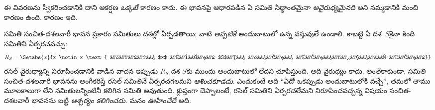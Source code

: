 \documentclass[../../../include/open-logic-section]{subfiles}
\begin{document}
ఈ వివరణను స్వీకరించడానికి దాని ఆకర్షణ
\emph{ఒక్కటే} కారణం కాదు.
ఈ భావనపై
ఆధారపడిన ఏ సమితి సిద్ధాంతమైనా
\emph{అవైరుధ్యమైనది} అని
నమ్మడానికి మంచి కారణం
ఉంది. కారణం ఇది.

సమితి సంచిత-దశలవారీ
భావన ప్రకారం సమితులు
దశల్లో ఏర్పడతాయి;
వాటి 
\emph{అప్పటికే} అందుబాటులో ఉన్న
వస్తువులే ఉండాలి.
కాబట్టి ఏ దశ~$S$కైనా
కింది సమితిని ఏర్పరచవచ్చు:
\[
	R_S = \Setabs{x}{x \notin x \text{ మరియు $x$ అనేది $S$కు ముందు అందుబాటులో ఉంది}}
\]
రసెల్ వైరుధ్యాన్ని
నిరూపించడానికి వాడిన వాదన ఇప్పుడు
$R_S$ దశ $S$కు ముందు అందుబాటులో లేదని చూపిస్తుంది.
అది వైరుధ్యం కాదు.
అంతేకాకుండా, సమితి
సంచిత-దశలవారీ భావనను
అంగీకరిస్తే రసెల్
సమితినే ఏర్పరచగలమని
\emph{ఆశించకూడదు}.
ఎందుకంటే అది ``ఏదో ఒకప్పుడు
అందుబాటులోకి వచ్చే'', తమలో తాము
మూలకాలుగా లేని సమితులన్నింటినీ
కలిగిన సమితి
అవుతుంది.
క్లుప్తంగా చెప్పాలంటే, రసెల్ సమితిని ఏర్పరచలేమని
నిరూపించవచ్చన్న విషయం సంచిత-దశలవారీ భావనను బట్టి
\emph{ఆశ్చర్యం కలిగించదు}. మనం \emph{ఊహించేదే} అది.

%

\end{document}
